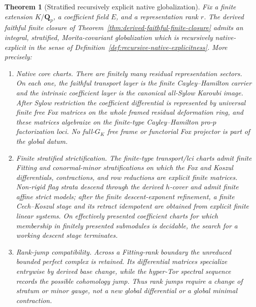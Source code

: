 \documentclass[11pt]{article}
\newtheorem{theorem}{Theorem}[section]
\theoremstyle{definition}
\newcommand{\Qp}{\mathbf Q_p}
\begin{document}
\begin{theorem}[Stratified recursively explicit native globalization]\label{thm:recursive-native-globalization}
Fix a finite extension $K/\Qp$, a coefficient field $E$, and a representation rank $r$.  The derived faithful finite closure of Theorem~\ref{thm:derived-faithful-finite-closure} admits an integral, stratified, Morita-covariant globalization which is recursively native-explicit in the sense of Definition~\ref{def:recursive-native-explicitness}.  More precisely:
\begin{enumerate}[label=\textnormal{(\roman*)}]
\item \emph{Native core charts.}  There are finitely many residual representation sectors.  On each one, the faithful transport layer is the finite Cayley--Hamilton carrier and the intrinsic coefficient layer is the canonical all-Sylow Karoubi image.  After Sylow restriction the coefficient differential is represented by universal finite free Fox matrices on the whole framed residual deformation ring, and these matrices algebraize on the finite-type Cayley--Hamilton pro-$p$ factorization loci.  No full-$G_K$ free frame or functorial Fox projector is part of the global datum.

\item \emph{Finite stratified strictification.}  The finite-type transport/lci charts admit finite Fitting and conormal-minor stratifications on which the Fox and Koszul differentials, contractions, and row reductions are explicit finite matrices.  Non-rigid flag strata descend through the derived $h$-cover and admit finite affine strict models; after the finite descent-exponent refinement, a finite Cech--Koszul stage and its retract idempotent are obtained from explicit finite linear systems.  On effectively presented coefficient charts for which membership in finitely presented submodules is decidable, the search for a working descent stage terminates.

\item \emph{Rank-jump compatibility.}  Across a Fitting-rank boundary the unreduced bounded perfect complex is retained.  Its differential matrices specialize entrywise by derived base change, while the hyper-Tor spectral sequence records the possible cohomology jump.  Thus rank jumps require a change of stratum or minor gauge, not a new global differential or a global minimal contraction.


\end{enumerate}
\end{theorem}
\end{document}
